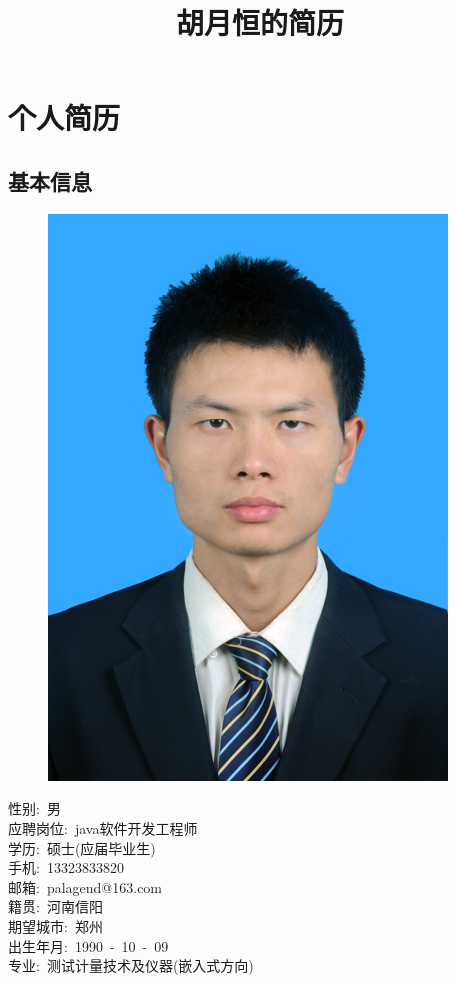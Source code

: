 \documentclass[12pt]{ctexart}
\title{胡月恒的简历}
\begin{document}
\maketitle
\tableofcontents

\section{个人简历}
\label{sec-1}
\subsection{基本信息}
\label{sec-1-1}
\begin{figure}
  \vspace{-25pt}
  \begin{center}
    \includegraphics{portrait.jpg}
  \end{center}
\end{figure}
性别:\ 男\\
应聘岗位:\ java软件开发工程师\\
学历:\ 硕士(应届毕业生)\\
手机:\ 13323833820\\
邮箱:\ palagend@163.com\\
籍贯:\ 河南信阳\\
期望城市:\ 郑州\\
出生年月:\ 1990\ -\ 10\ -\ 09\\
专业:\ 测试计量技术及仪器(嵌入式方向)\\
\end{document}
